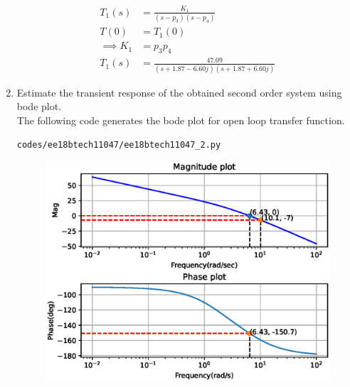 \begin{enumerate}[label=\thesubsection.\arabic*.,ref=\thesubsection.\theenumi]
\begin{align}
T_{1}(s) &= \frac{K_{1}}{(s-p_{3})(s-p_{4})}\\ 
T(0) &= T_{1}(0)\\
\implies K_{1} &= p_{3}p_{4}\\
T_{1}(s) &= \frac{47.09}{(s+1.87-6.60j)(s+1.87+6.60j)} \label{eq:ee18btech11047_a_tf1}
\end{align}
\item Estimate the transient response of the obtained second order system using bode plot.\\
\solution The following code generates the bode plot for open loop transfer function.
\begin{lstlisting}
codes/ee18btech11047/ee18btech11047_2.py
\end{lstlisting}
\begin{figure}[!ht]
\centering
\includegraphics[width=\columnwidth]{./figs/ee18btech11047/ee18btech11047_2.eps}
\caption{}
\label{fig:ee18btech11047_2}
\end{figure}


\end{enumerate}
